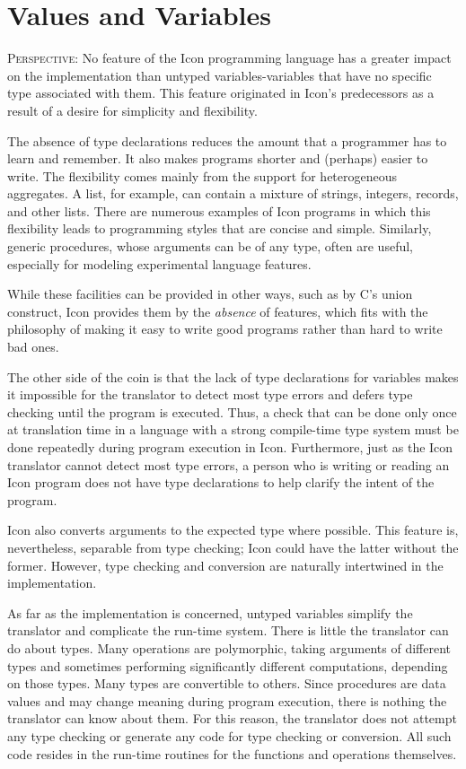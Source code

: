 \chapter{Values and Variables}

\textsc{Perspective}: No feature of the Icon programming language has
a greater impact on the implementation than untyped
variables-variables that have no specific type associated with
them. This feature originated in Icon's predecessors as a result of a
desire for simplicity and flexibility.

The absence of type declarations reduces the amount that a programmer
has to learn and remember. It also makes programs shorter and
(perhaps) easier to write. The flexibility comes mainly from the
support for heterogeneous aggregates. A list, for example, can contain
a mixture of strings, integers, records, and other lists. There are
numerous examples of Icon programs in which this flexibility leads to
programming styles that are concise and simple. Similarly,
{\textquotedbl}generic{\textquotedbl} procedures, whose arguments can
be of any type, often are useful, especially for modeling experimental
language features.

While these facilities can be provided in other ways, such as by C's
union construct, Icon provides them by the \textit{absence} of
features, which fits with the philosophy of making it easy to write
good programs rather than hard to write bad ones.

The other side of the coin is that the lack of type declarations for
variables makes it impossible for the translator to detect most type
errors and defers type checking until the program is executed. Thus, a
check that can be done only once at translation time in a language
with a strong compile-time type system must be done repeatedly during
program execution in Icon. Furthermore, just as the Icon translator
cannot detect most type errors, a person who is writing or reading an
Icon program does not have type declarations to help clarify the
intent of the program.

Icon also converts arguments to the expected type where possible. This
feature is, nevertheless, separable from type checking; Icon could
have the latter without the former. However, type checking and
conversion are naturally intertwined in the implementation.

As far as the implementation is concerned, untyped variables simplify
the translator and complicate the run-time system.  There is little
the translator can do about types. Many operations are polymorphic,
taking arguments of different types and sometimes performing
significantly different computations, depending on those types. Many
types are convertible to others. Since procedures are data values and
may change meaning during program execution, there is nothing the
translator can know about them. For this reason, the translator does
not attempt any type checking or generate any code for type checking
or conversion. All such code resides in the run-time routines for the
functions and operations themselves.

